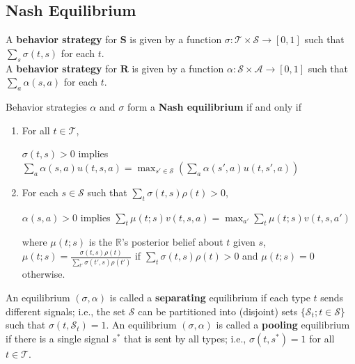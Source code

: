 \documentclass[11pt]{elegantbook}
\begin{document}
\subsection{Nash Equilibrium}
\begin{definition}[Strategy]
    \normalfont
    A \textbf{behavior strategy} for $\mathbf{S}$ is given by a function $\sigma: \mathcal{T}\times\mathcal{S} \rightarrow [0,1]$ such that $\sum_s \sigma(t,s)$ for each $t$.\\
    A \textbf{behavior strategy} for $\mathbf{R}$ is given by a function $\alpha: \mathcal{S}\times\mathcal{A} \rightarrow [0,1]$ such that $\sum_a \alpha(s,a)$ for each $t$.
\end{definition}

\begin{definition}
    \normalfont
    Behavior strategies $\alpha$ and $\sigma$ form a \textbf{Nash equilibrium} if and only if
    \begin{enumerate}
        \item For all $t\in \mathcal{T}$,
        \begin{center}
            $\sigma(t,s)>0$ implies $\sum_a \alpha(s,a)u(t,s,a) = \max_{s'\in \mathcal{S}}\left(\sum_a \alpha(s',a)u(t,s',a)\right)$
        \end{center}
        \item For each $s\in \mathcal{S}$ such that $\sum_{t}\sigma(t,s)\rho(t)>0$,
        \begin{center}
            $\alpha(s,a)>0$ implies $\sum_{t}\mu(t;s)v(t,s,a) = \max_{a'}\sum_{t}\mu(t;s)v(t,s,a')$
        \end{center}
        where $\mu(t;s)$ is the $\mathbb{R}$'s posterior belief about $t$ given $s$, $\mu(t;s)=\frac{\sigma(t,s)\rho(t)}{\sum_{t'}\sigma(t',s)\rho(t')}$ if $\sum_t\sigma(t,s)\rho(t)>0$ and $\mu(t;s)=0$ otherwise.
    \end{enumerate}
\end{definition}

\begin{definition}
    \normalfont
    An equilibrium $(\sigma,\alpha)$ is called a \textbf{separating} equilibrium if each type $t$ sends different signals; i.e., the set $\mathcal{S}$ can be partitioned into (disjoint) sets $\{\mathcal{S}_t; t\in \mathcal{S}\}$ such that $\sigma(t, \mathcal{S}_t) = 1$. An equilibrium $(\sigma,\alpha)$ is called a \textbf{pooling} equilibrium if there is a single signal $s^*$ that is sent by all types; i.e., $\sigma(t, s^*) = 1$ for all $t\in \mathcal{T}$.
\end{definition}
\end{document}
